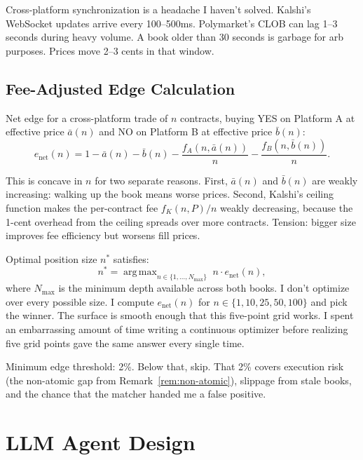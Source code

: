 \documentclass[11pt]{article}
\theoremstyle{definition}
\theoremstyle{remark}
\DeclareMathOperator*{\argmax}{arg\,max}
\begin{document}
Cross-platform synchronization is a headache I haven't solved. Kalshi's WebSocket updates arrive every 100--500ms. Polymarket's CLOB can lag 1--3 seconds during heavy volume. A book older than 30 seconds is garbage for arb purposes. Prices move 2--3 cents in that window.

\subsection{Fee-Adjusted Edge Calculation}
\label{sec:edge-calc}

Net edge for a cross-platform trade of $n$ contracts, buying YES on Platform A at effective price $\bar{a}(n)$ and NO on Platform B at effective price $\bar{b}(n)$:
\begin{equation}
\label{eq:full-edge}
e_{\text{net}}(n) = 1 - \bar{a}(n) - \bar{b}(n) - \frac{f_A(n, \bar{a}(n))}{n} - \frac{f_B(n, \bar{b}(n))}{n}.
\end{equation}

This is concave in $n$ for two separate reasons. First, $\bar{a}(n)$ and $\bar{b}(n)$ are weakly increasing: walking up the book means worse prices. Second, Kalshi's ceiling function makes the per-contract fee $f_K(n, P)/n$ weakly decreasing, because the 1-cent overhead from the ceiling spreads over more contracts. Tension: bigger size improves fee efficiency but worsens fill prices.

Optimal position size $n^*$ satisfies:
\begin{equation}
n^* = \argmax_{n \in \{1, \ldots, N_{\max}\}} \; n \cdot e_{\text{net}}(n),
\end{equation}
where $N_{\max}$ is the minimum depth available across both books. I don't optimize over every possible size. I compute $e_{\text{net}}(n)$ for $n \in \{1, 10, 25, 50, 100\}$ and pick the winner. The surface is smooth enough that this five-point grid works. I spent an embarrassing amount of time writing a continuous optimizer before realizing five grid points gave the same answer every single time.

Minimum edge threshold: 2\%. Below that, skip. That 2\% covers execution risk (the non-atomic gap from Remark~\ref{rem:non-atomic}), slippage from stale books, and the chance that the matcher handed me a false positive.

\section{LLM Agent Design}
\label{sec:agent}
\end{document}

